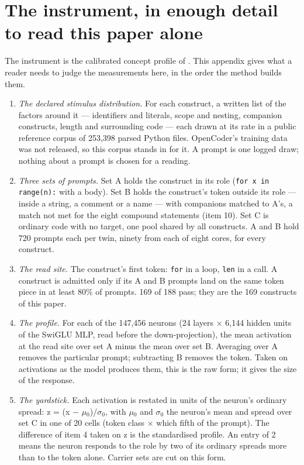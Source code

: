 \documentclass{article}
\begin{document}


\appendix
\section{The instrument, in enough detail to read this paper alone}

The instrument is the calibrated concept profile of \citet{wilam2026}. This appendix gives what a reader needs to judge the measurements here, in the order the method builds them.

\begin{enumerate}[topsep=2pt,itemsep=1pt,parsep=0pt,partopsep=0pt,leftmargin=*]
\item \emph{The declared stimulus distribution.} For each construct, a written list of the factors around it --- identifiers and literals, scope and nesting, companion constructs, length and surrounding code --- each drawn at its rate in a public reference corpus of 253,398 parsed Python files. OpenCoder's training data was not released, so this corpus stands in for it. A prompt is one logged draw; nothing about a prompt is chosen for a reading.
\item \emph{Three sets of prompts.} Set A holds the construct in its role (\texttt{for x in range(n):} with a body). Set B holds the construct's token outside its role --- inside a string, a comment or a name --- with companions matched to A's, a match not met for the eight compound statements (item 10). Set C is ordinary code with no target, one pool shared by all constructs. A and B hold 720 prompts each per twin, ninety from each of eight cores, for every construct.
\item \emph{The read site.} The construct's first token: \texttt{for} in a loop, \texttt{len} in a call. A construct is admitted only if its A and B prompts land on the same token piece in at least 80\% of prompts. 169 of 188 pass; they are the 169 constructs of this paper.
\item \emph{The profile.} For each of the 147,456 neurons (24 layers $\times$ 6,144 hidden units of the SwiGLU MLP, read before the down-projection), the mean activation at the read site over set A minus the mean over set B. Averaging over A removes the particular prompt; subtracting B removes the token. Taken on activations as the model produces them, this is the raw form; it gives the size of the response.
\item \emph{The yardstick.} Each activation is restated in units of the neuron's ordinary spread: z = (x $-$ $\mu$$_0$)/$\sigma$$_0$, with $\mu$$_0$ and $\sigma$$_0$ the neuron's mean and spread over set C in one of 20 cells (token class $\times$ which fifth of the prompt). The difference of item 4 taken on z is the standardised profile. An entry of 2 means the neuron responds to the role by two of its ordinary spreads more than to the token alone. Carrier sets are cut on this form.

\end{enumerate}
\end{document}
